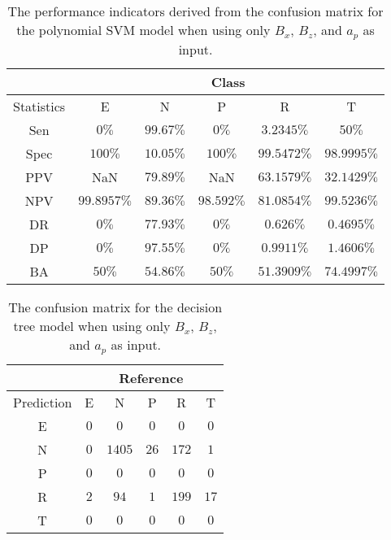 \begin{table}[!ht]
	\centering
	\begin{tabular}{|c|c|c|c|c|c|}
		\hline
		 & \multicolumn{5}{c|}{Class} \\ \hline
		Statistics & E & N & P & R & T \\ \hline
		Sen & $0\%$ & $99.67\%$ & $0\%$ & $3.2345\%$ & $50\%$ \\ \hline
		Spec & $100\%$ & $10.05\%$ & $100\%$ & $99.5472\%$ & $98.9995\%$ \\ \hline
		PPV & NaN & $79.89\%$ & NaN & $63.1579\%$ & $32.1429\%$ \\ \hline
		NPV & $99.8957\%$ & $89.36\%$ & $98.592\%$ & $81.0854\%$ & $99.5236\%$ \\ \hline
		DR & $0\%$ & $77.93\%$ & $0\%$ & $0.626\%$ & $0.4695\%$ \\ \hline
		DP & $0\%$ & $97.55\%$ & $0\%$ & $0.9911\%$ & $1.4606\%$ \\ \hline
		BA & $50\%$ & $54.86\%$ & $50\%$ & $51.3909\%$ & $74.4997\%$ \\ \hline
	\end{tabular}
	\caption{The performance indicators derived from the confusion matrix for the polynomial SVM model when using only $B_{x}$, $B_{z}$, and $a_{p}$ as input.}
	\label{tab:cs:reverse:xzap:svmPoly}
\end{table}

\begin{table}[!ht]
	\centering
	\begin{tabular}{|c|c|c|c|c|c|}
		\hline
		 & \multicolumn{5}{|c|}{Reference} \\ \hline
		 Prediction & E & N & P & R & T \\ \hline
		 E & $0$ & $0$ & $0$ & $0$ & $0$ \\ \hline
		 N & $0$ & $1405$ & $26$ & $172$ & $1$ \\ \hline
		 P & $0$ & $0$ & $0$ & $0$ & $0$ \\ \hline
		 R & $2$ & $94$ & $1$ & $199$ & $17$ \\ \hline
		 T & $0$ & $0$ & $0$ & $0$ & $0$ \\ \hline
	\end{tabular}
	\caption{The confusion matrix for the decision tree model when using only $B_{x}$, $B_{z}$, and $a_{p}$ as input.}
	\label{tab:cm:xzap:C5.0}
\end{table}

